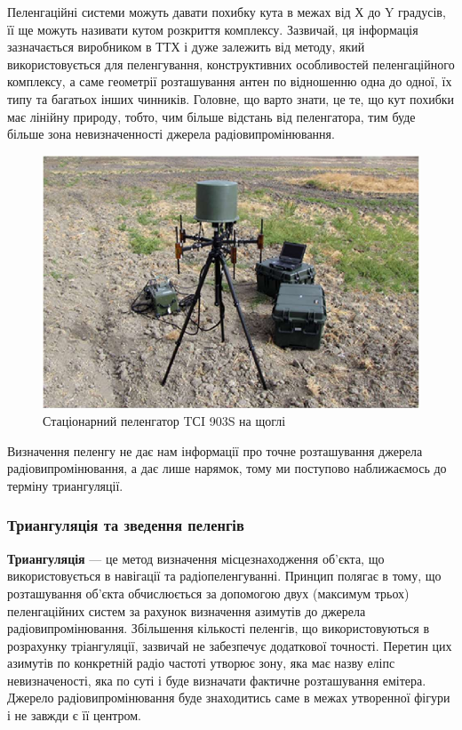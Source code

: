 \documentclass{article}
\begin{document}
Пеленгаційні системи можуть давати похибку кута в межах від Х до Y градусів, її ще можуть називати кутом розкриття комплексу. Зазвичай, ця інформація зазначається виробником в ТТХ і дуже залежить від методу, який використовується для пеленгування,  конструктивних особливостей пеленгаційного комплексу, а саме геометрії розташування антен по відношенню одна до одної, їх типу та багатьох інших чинників. Головне, що варто знати, це те, що кут похибки має лінійну природу, тобто, чим більше відстань від пеленгатора, тим буде більше зона невизначенності джерела радіовипромінювання.

\begin{figure}[H]
	\centering
	\includegraphics[width=0.8\linewidth]{images/tsi.png}
	\caption{\label{fig:tsi} Стаціонарний пеленгатор TСI 903S на щоглі}
\end{figure}

 
Визначення пеленгу не дає нам інформації про точне розташування джерела радіовипромінювання, а дає лише нарямок, тому ми поступово наближаємось до терміну триангуляції.  

\subsubsection{Триангуляція та зведення пеленгів}
\textbf{Триангуляція} --- це метод визначення місцезнаходження об'єкта, що використовується в навігації та радіопеленгуванні. Принцип полягає в тому, що розташування об'єкта обчислюється за допомогою двух (максимум трьох) пеленгаційних систем за рахунок визначення азимутів до джерела радіовипромінювання. Збільшення кількості пеленгів, що використовуються в розрахунку тріангуляції, зазвичай не забезпечує додаткової точності. Перетин цих азимутів по конкретній радіо частоті утворює зону, яка має назву еліпс невизначеності, яка по суті і буде визначати фактичне розташування емітера. Джерело радіовипромінювання буде знаходитись саме в межах утворенної фігури і не завжди є її центром.
\end{document}

